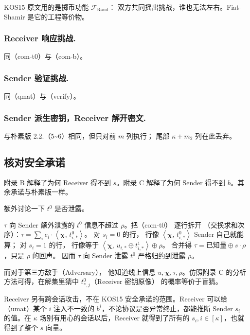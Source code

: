 KOS15 原文用的是掷币功能 $\mathcal{F}_{\mathrm{Rand}}$：
双方共同摇出挑战，谁也无法左右。Fiat-Shamir 是它的工程等价物。

\subsubsection{Receiver 响应挑战.}

同（com-t0）与（com-b）。

\subsubsection{Sender 验证挑战.}

同（qmat）与（verify）。

\subsubsection{Sender 派生密钥，Receiver 解开密文.}

与朴素版 2.2.（5\textasciitilde6）相同，但只对前 $m$ 列执行；
尾部 $\kappa + m_2$ 列在此丢弃。

\subsection{核对安全承诺}

附录 B 解释了为何 Receiver 得不到 $s$。附录 C 解释了为何 Sender
得不到 $b$。其余承诺与朴素版一样。

额外讨论一下 $t^0$ 是否泄露。

$\tau$ 向 Sender 额外泄露的 $t^0$ 信息不超过 $\rho$。把（com-t0）
逐行拆开
（交换求和次序）：$\tau = \sum_i e_i \cdot \left<\boldsymbol{\chi},\, t^0_{i,*}\right>$。
对 $s_i = 0$ 的行，
行像 $\left<\boldsymbol{\chi},\, t^0_{i,*}\right>$ Sender 自己就能算；
对 $s_i = 1$ 的行，
行像等于 $\left<\boldsymbol{\chi},\, u_{i,*} \oplus t^1_{i,*}\right> \oplus \rho$。
合并得 $\tau = \text{已知量} \oplus s \cdot \rho$，只是 $\rho$ 的回声。
因而 $\tau$ 向 Sender 泄露 $t^0$ 严格归约到泄露 $\rho$。

而对于第三方敌手（Adversary），
他知道线上信息 $u, \boldsymbol{\chi}, \tau, \rho$。仿照附录 C
的分析方法可得，在解集里猜中 $t_{*,j}^0$（Receiver 密钥原像）
的概率等价于盲猜。

Receiver 另有跨会话攻击，不在 KOS15 安全承诺的范围。Receiver 可以给
（umat）某个 $i$ 注入不一致的 $b^i$，不论协议是否异常终止，都能推断
Sender $s_{i}$ 的值。在 $\kappa$ 场别有用心的会话以后，Receiver
就得到了所有的 $s_{i}, i\in[\kappa]$，也就得到了整个 $s$ 向量。

